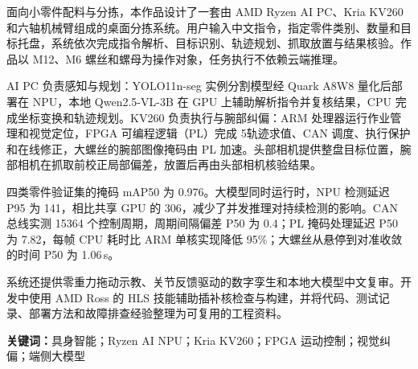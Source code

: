 \vspace{0.6ex}

面向小零件配料与分拣，本作品设计了一套由 AMD Ryzen AI PC、Kria KV260 和六轴机械臂组成的桌面分拣系统。用户输入中文指令，指定零件类别、数量和目标托盘，系统依次完成指令解析、目标识别、轨迹规划、抓取放置与结果核验。作品以 M12、M6 螺丝和螺母为操作对象，任务执行不依赖云端推理。

AI PC 负责感知与规划：YOLO11n-seg 实例分割模型经 Quark A8W8 量化后部署在 NPU，本地 Qwen2.5-VL-3B 在 GPU 上辅助解析指令并复核结果，CPU 完成坐标变换和轨迹规划。KV260 负责执行与腕部纠偏：ARM 处理器运行作业管理和视觉定位，FPGA 可编程逻辑（PL）完成 5\ms 轨迹求值、CAN 调度、执行保护和在线修正，大螺丝的腕部图像掩码由 PL 加速。头部相机提供整盘目标位置，腕部相机在抓取前校正局部偏差，放置后再由头部相机核验结果。

四类零件验证集的掩码 mAP50 为 0.976。大模型同时运行时，NPU 检测延迟 P95 为 141\ms，相比共享 GPU 的 306\ms，减少了并发推理对持续检测的影响。CAN 总线实测 15364 个控制周期，周期间隔偏差 P50 为 0.4\us；PL 掩码处理延迟 P50 为 7.82\ms，每帧 CPU 耗时比 ARM 单核实现降低 95\%；大螺丝从悬停到对准收敛的时间 P50 为 1.06\,s。

系统还提供零重力拖动示教、关节反馈驱动的数字孪生和本地大模型中文复审。开发中使用 AMD Ross 的 HLS 技能辅助插补核检查与构建，并将代码、测试记录、部署方法和故障排查经验整理为可复用的工程资料。

\noindent\textbf{关键词：}具身智能；Ryzen AI NPU；Kria KV260；FPGA 运动控制；视觉纠偏；端侧大模型
